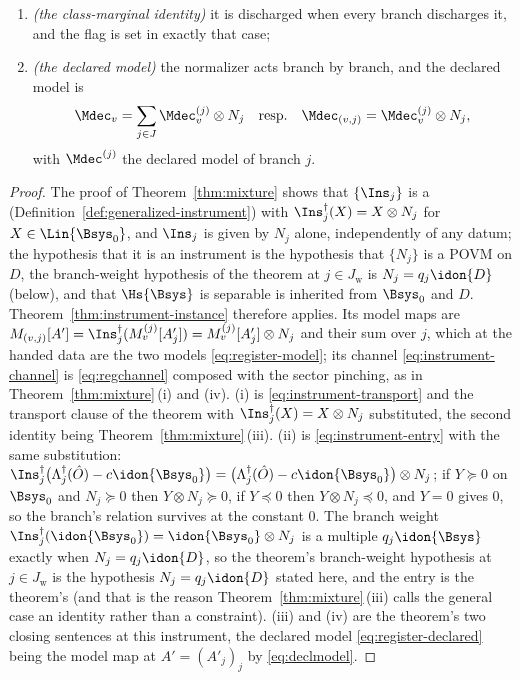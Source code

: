 \begin{corollary}
\begin{enumerate}[label=(\roman*),leftmargin=3.0em]
  that the certificate holds at $0$ with the branch's relation; the
  branch-weight entry $(\Pi_j,=,q_j)$ is listed for every $j\in J_{\mathrm{w}}$;
\item \emph{(the class-marginal identity)} it is discharged when every
  branch discharges it, and the flag is set in exactly that case;
\item \emph{(the declared model)} the normalizer acts branch by branch, and
  the declared model is
  \begin{equation}\label{eq:register-declared}
    \Mdec_v=\sum_{j\in J}{\Mdec}^{(j)}_v\otimes N_j
    \quad\text{resp.}\quad
    \Mdec_{(v,j)}={\Mdec}^{(j)}_v\otimes N_j ,
  \end{equation}
  with ${\Mdec}^{(j)}$ the declared model of branch $j$.
\end{enumerate}
\end{corollary}

\begin{proof}
The proof of Theorem~\ref{thm:mixture} shows that $\{\Ins_j\}$ is a
 (Definition~\ref{def:generalized-instrument})
with $\Ins_j^{\dagger}(X)=X\otimes N_j$ for $X\in\Lin{\Bsys_0}$, and $\Ins_j$
is given by $N_j$ alone, independently of any datum; the hypothesis that it
is an instrument is the hypothesis that $\{N_j\}$ is a POVM on $D$, the
branch-weight hypothesis of the theorem at $j\in J_{\mathrm{w}}$ is
$N_j=q_j\idon{D}$ (below), and that
$\Hs{\Bsys}$ is separable is inherited from $\Bsys_0$ and $D$.
Theorem~\ref{thm:instrument-instance} therefore applies. Its model maps are
$M_{(v,j)}[A']=\Ins_j^{\dagger}(M^{(j)}_v[A'_j])=M^{(j)}_v[A'_j]\otimes N_j$
and their sum over $j$, which at the handed data are the two models
\eqref{eq:register-model}; its channel \eqref{eq:instrument-channel} is
\eqref{eq:regchannel} composed with the sector pinching, as in
Theorem~\ref{thm:mixture}\,(i) and (iv). (i) is
\eqref{eq:instrument-transport} and the transport clause of the theorem with
$\Ins_j^{\dagger}(X)=X\otimes N_j$ substituted, the second identity being
Theorem~\ref{thm:mixture}\,(iii). (ii) is \eqref{eq:instrument-entry} with
the same substitution:
$\Ins_j^{\dagger}\big(\Lambda_j^{\dagger}(\hat O)-c\idon{\Bsys_0}\big)
=\big(\Lambda_j^{\dagger}(\hat O)-c\idon{\Bsys_0}\big)\otimes N_j$; if
$Y\succeq0$ on $\Bsys_0$ and $N_j\succeq0$ then $Y\otimes N_j\succeq0$, if
$Y\preceq0$ then $Y\otimes N_j\preceq0$, and $Y=0$ gives $0$, so the branch's
relation survives at the constant $0$. The branch weight
$\Ins_j^{\dagger}(\idon{\Bsys_0})=\idon{\Bsys_0}\otimes N_j$ is a multiple
$q_j\idon{\Bsys}$ exactly when $N_j=q_j\idon{D}$, so the theorem's
branch-weight hypothesis at $j\in J_{\mathrm{w}}$ is the hypothesis
$N_j=q_j\idon{D}$ stated here, and the entry is the theorem's (and that is
the reason Theorem~\ref{thm:mixture}\,(iii) calls the general case an
identity rather than a constraint). (iii) and (iv)
are the theorem's two closing sentences at this instrument, the declared
model \eqref{eq:register-declared} being the model map at
$A'=(A'_j)_j$ by \eqref{eq:declmodel}.
\end{proof}

